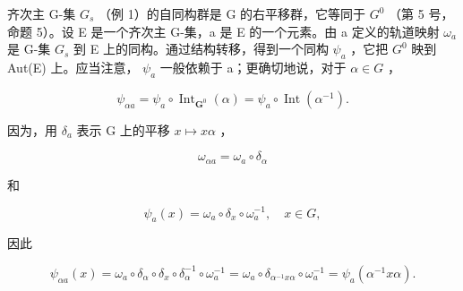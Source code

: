 齐次主 G-集 \(G_{s}\) （例 1）的自同构群是 G 的右平移群，它等同于 \(G^{0}\) （第 5 号，命题 5）。设 E 是一个齐次主 G-集，a 是 E 的一个元素。由 a 定义的轨道映射 \(\omega_{a}\) 是 G-集 \(G_{s}\) 到 E 上的同构。通过结构转移，得到一个同构 \(\psi_{a}\) ，它把 \(G^{0}\) 映到 Aut(E) 上。应当注意， \(\psi_{a}\) 一般依赖于 a；更确切地说，对于 \(\alpha \in G\) ，

\[
\psi_ {\alpha a} = \psi_ {a} \circ \operatorname{Int} _ {\mathbf {G} ^ {0}} (\alpha) = \psi_ {a} \circ \operatorname{Int} (\alpha^ {- 1}).\tag{3}
\]

因为，用 \(\delta_{a}\) 表示 G 上的平移 \(x\mapsto x\alpha\) ，

\[
\omega_ {\alpha a} = \omega_ {a} \circ \delta_ {\alpha}
\]

和

\[
\psi_ {a} (x) = \omega_ {a} \circ \delta_ {x} \circ \omega_ {a} ^ {- 1}, \quad x \in G,
\]

因此

\[
\psi_ {\alpha a} (x) = \omega_ {a} \circ \delta_ {\alpha} \circ \delta_ {x} \circ \delta_ {\alpha} ^ {- 1} \circ \omega_ {a} ^ {- 1} = \omega_ {a} \circ \delta_ {\alpha^ {- 1} x \alpha} \circ \omega_ {a} ^ {- 1} = \psi_ {a} (\alpha^ {- 1} x \alpha).
\]

